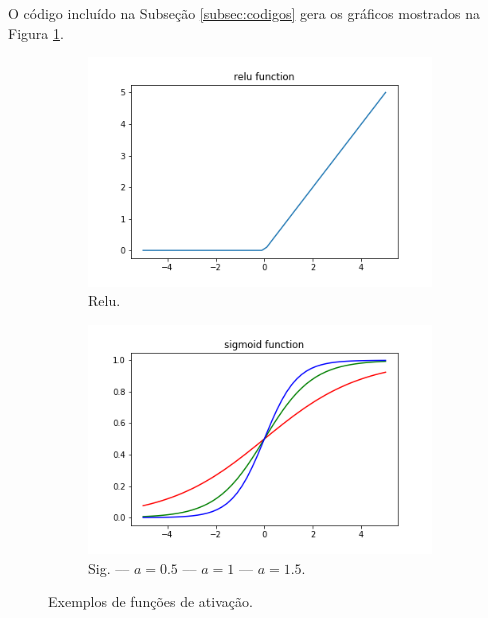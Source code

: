 \documentclass[10pt,journal,compsoc]{IEEEtran}
\begin{document}
O código incluído na Subseção \ref{subsec:codigos} gera os gráficos mostrados
na Figura \ref{fig:plots}.
\begin{figure}
     \centering
     \begin{subfigure}[b]{0.3\textwidth}
         \centering
         \includegraphics[width=\textwidth]{figs/relu.png}
         \caption{Relu.}
     \end{subfigure}
     \hfill
     \begin{subfigure}[b]{0.3\textwidth}
         \centering
         \includegraphics[width=\textwidth]{figs/sigmoid.png}
         \caption{Sig. { \color{red} ––} $a=0.5$
                            { \color{green} ––} $a=1$ 
                            { \color{blue} ––} $a=1.5$.
                 }
     \end{subfigure}
        \caption{Exemplos de funções de ativação.}
        \label{fig:plots}
\end{figure}
\end{document}
